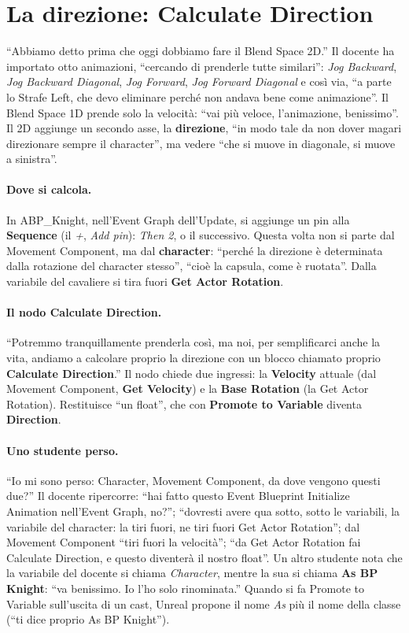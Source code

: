 \section{La direzione: Calculate Direction}
\label{ue9:sec:direction}

``Abbiamo detto prima che oggi dobbiamo fare il Blend Space 2D.'' Il docente ha importato
otto animazioni, ``cercando di prenderle tutte similari'': \emph{Jog Backward},
\emph{Jog Backward Diagonal}, \emph{Jog Forward}, \emph{Jog Forward Diagonal} e così
via, ``a parte lo Strafe Left, che devo eliminare perché non andava bene come
animazione''. Il Blend Space 1D prende solo la velocità: ``vai più veloce, l'animazione,
benissimo''. Il 2D aggiunge un secondo asse, la \textbf{direzione}, ``in modo tale da non
dover magari direzionare sempre il character'', ma vedere ``che si muove in diagonale, si
muove a sinistra''.

\paragraph{Dove si calcola.} In ABP\_Knight, nell'Event Graph dell'Update, si aggiunge un
pin alla \textbf{Sequence} (il \emph{+}, \emph{Add pin}): \emph{Then 2}, o il successivo.
Questa volta non si parte dal Movement Component, ma dal \textbf{character}: ``perché la
direzione è determinata dalla rotazione del character stesso'', ``cioè la capsula, come è
ruotata''. Dalla variabile del cavaliere si tira fuori \textbf{Get Actor Rotation}.

\paragraph{Il nodo Calculate Direction.} ``Potremmo tranquillamente prenderla così, ma noi,
per semplificarci anche la vita, andiamo a calcolare proprio la direzione con un blocco
chiamato proprio \textbf{Calculate Direction}.'' Il nodo chiede due ingressi: la
\textbf{Velocity} attuale (dal Movement Component, \textbf{Get Velocity}) e la
\textbf{Base Rotation} (la Get Actor Rotation). Restituisce ``un float'', che con
\textbf{Promote to Variable} diventa \textbf{Direction}.

\paragraph{Uno studente perso.} ``Io mi sono perso: Character, Movement Component, da dove
vengono questi due?'' Il docente ripercorre: ``hai fatto questo Event Blueprint Initialize
Animation nell'Event Graph, no?''; ``dovresti avere qua sotto, sotto le variabili, la
variabile del character: la tiri fuori, ne tiri fuori Get Actor Rotation''; dal Movement
Component ``tiri fuori la velocità''; ``da Get Actor Rotation fai Calculate Direction, e
questo diventerà il nostro float''. Un altro studente nota che la variabile del docente si
chiama \emph{Character}, mentre la sua si chiama \textbf{As BP Knight}: ``va benissimo.
Io l'ho solo rinominata.'' Quando si fa Promote to Variable sull'uscita di un cast, Unreal
propone il nome \emph{As} più il nome della classe (``ti dice proprio As BP Knight'').

